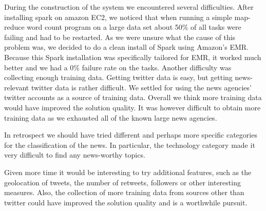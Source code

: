 \documentclass{llncs}
\begin{document}
During the construction of the system we encountered several difficulties. After installing spark on amazon EC2, we noticed that when running a simple map-reduce word count program on a large data set about 50\% of all tasks were failing and had to be restarted. As we were unsure what the cause of this problem was, we decided to do a clean install of Spark using Amazon's EMR. Because this Spark installation was specifically tailored for EMR, it worked much better and we had a 0\% failure rate on the tasks. Another difficulty was collecting enough training data. Getting twitter data is easy, but getting news-relevant twitter data is rather difficult. We settled for using the news agencies' twitter accounts as a source of training data. Overall we think more training data would have improved the solution quality. It was however difficult to obtain more training data as we exhausted all of the known large news agencies.

In retrospect we should have tried different and perhaps more specific categories for the classification of the news. In particular, the technology category made it very difficult to find any news-worthy topics.

Given more time it would be interesting to try additional features, such as the geolocation of tweets, the number of retweets, followers or other interesting measures. Also, the collection of more training data from sources other than twitter could have improved the solution quality and is a worthwhile pursuit.



\end{document}

